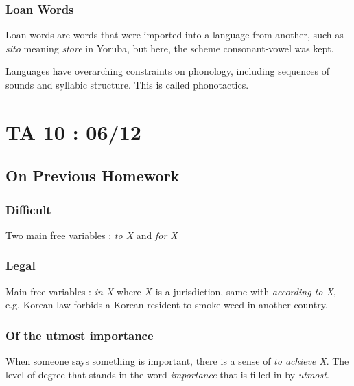\documentclass{cours}
\begin{document}
\subsubsection{Loan Words}
Loan words are words that were imported into a language from another, such as \textsl{sito} meaning \textsl{store} in Yoruba, but here, the scheme consonant-vowel was kept.

Languages have overarching constraints on phonology, including sequences of sounds and syllabic structure. This is called phonotactics.


\section{TA 10\! : 06/12}
\subsection{On Previous Homework}
\subsubsection{Difficult}
Two main free variables\! : \textit{to X} and \textit{for X}

\subsubsection{Legal}
Main free variables\! : \textit{in X} where $X$ is a jurisdiction, same with \textit{according to X}, e.g. Korean law forbids a Korean resident to smoke weed in another country.

\subsubsection{Of the utmost importance}
When someone says something is important, there is a sense of \textit{to achieve X}. The level of degree that stands in the word \textit{importance} that is filled in by \textit{utmost}.
\end{document}
